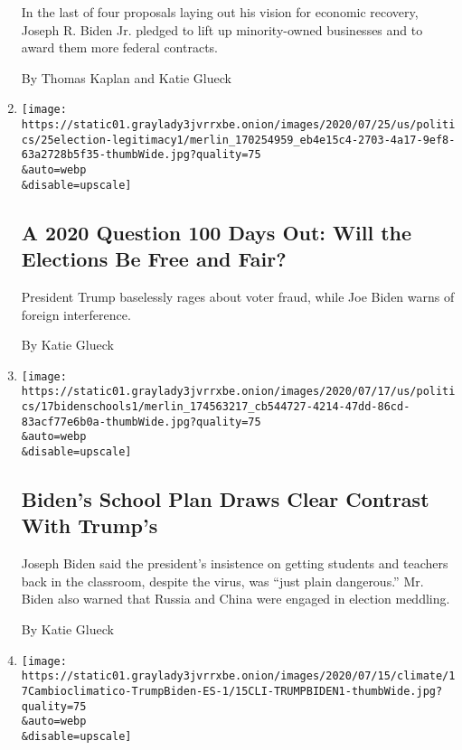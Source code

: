 \begin{enumerate}
  In the last of four proposals laying out his vision for economic
  recovery, Joseph R. Biden Jr. pledged to lift up minority-owned
  businesses and to award them more federal contracts.

  By Thomas Kaplan and Katie Glueck
\item
  \href{/2020/07/25/us/politics/2020-election-voter-fraud-interference.html}{}

  \texttt{[image: https://static01.graylady3jvrrxbe.onion/images/2020/07/25/us/politics/25election-legitimacy1/merlin\_170254959\_eb4e15c4-2703-4a17-9ef8-63a2728b5f35-thumbWide.jpg?quality=75\\\&auto=webp\\\&disable=upscale]}

  \hypertarget{a-2020-question-100-days-out-will-the-elections-be-free-and-fair}{%
  \subsection{A 2020 Question 100 Days Out: Will the Elections Be Free
  and
  Fair?}\label{a-2020-question-100-days-out-will-the-elections-be-free-and-fair}}

  President Trump baselessly rages about voter fraud, while Joe Biden
  warns of foreign interference.

  By Katie Glueck
\item
  \href{/2020/07/17/us/politics/biden-schools-reopening.html}{}

  \texttt{[image: https://static01.graylady3jvrrxbe.onion/images/2020/07/17/us/politics/17bidenschools1/merlin\_174563217\_cb544727-4214-47dd-86cd-83acf77e6b0a-thumbWide.jpg?quality=75\\\&auto=webp\\\&disable=upscale]}

  \hypertarget{bidens-school-plan-draws-clear-contrast-with-trumps}{%
  \subsection{Biden's School Plan Draws Clear Contrast With
  Trump's}\label{bidens-school-plan-draws-clear-contrast-with-trumps}}

  Joseph Biden said the president's insistence on getting students and
  teachers back in the classroom, despite the virus, was ``just plain
  dangerous.'' Mr. Biden also warned that Russia and China were engaged
  in election meddling.

  By Katie Glueck
\item
  \href{/es/2020/07/17/espanol/estados-unidos/cambio-climatico-trump-biden.html}{}

  \texttt{[image: https://static01.graylady3jvrrxbe.onion/images/2020/07/15/climate/17Cambioclimatico-TrumpBiden-ES-1/15CLI-TRUMPBIDEN1-thumbWide.jpg?quality=75\\\&auto=webp\\\&disable=upscale]}


\end{enumerate}
